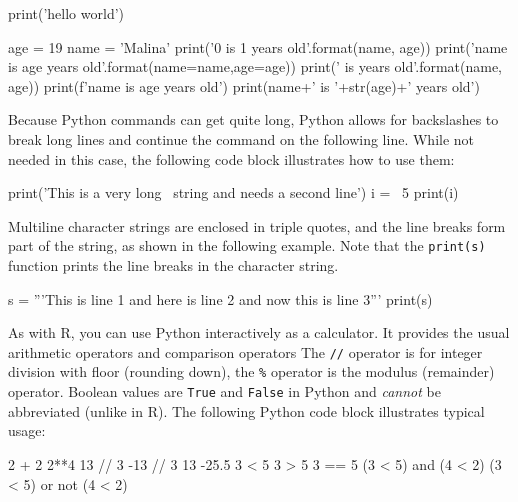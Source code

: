 \begin{samepage}
\begin{pythoncode}
print('hello world')

age = 19
name = 'Malina'
print('{0} is {1} years old'.format(name, age))
print('{name} is {age} years old'.format(name=name,age=age))
print('{} is {} years old'.format(name, age))
print(f'{name} is {age} years old')
print(name+' is '+str(age)+' years old')
\end{pythoncode}
\end{samepage}

\noindent Because Python commands can get quite long, Python allows for backslashes to break long lines and continue the command on the following line. While not needed in this case, the following code block illustrates how to use them:

\begin{samepage}
\begin{pythoncode}
print('This is a very long \
string and needs a second line')
i = \
5
print(i)
\end{pythoncode}
\end{samepage}

\noindent Multiline character strings are enclosed in triple quotes, and the line breaks form part of the string, as shown in the following example. Note that the \texttt{print(s)} function prints the line breaks in the character string.

\begin{samepage}
\begin{pythoncode}
s = '''This is line 1
and here is line 2
and now this is line 3'''
print(s)
\end{pythoncode}
\end{samepage}

\noindent As with R, you can use Python interactively as a calculator. It provides the usual arithmetic operators and comparison operators The \texttt{//} operator is for integer division with floor (rounding down), the \texttt{\%} operator is the modulus (remainder) operator. Boolean values are \texttt{True} and \texttt{False} in Python and \emph{cannot} be abbreviated (unlike in R). The following Python code block illustrates typical usage:

\begin{samepage}
\begin{pythoncode}
2 + 2
2**4
13 // 3
-13 // 3
13 %
-25.5 %
3 < 5
3 > 5
3 == 5
(3 < 5) and (4 < 2)
(3 < 5) or not (4 < 2)
\end{pythoncode}
\end{samepage}

